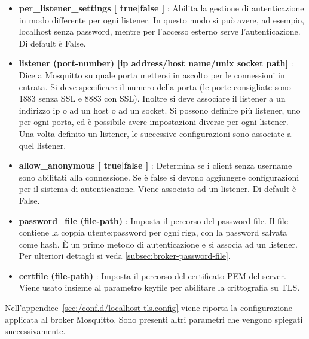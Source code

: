 \begin{itemize}
    \item \textbf{per\_listener\_settings [ true|false ]} :\label{table:broker-per-listener}\newline
    Abilita la gestione di autenticazione in modo differente per ogni listener.
    In questo modo si può avere, ad esempio, localhost senza password, mentre per l'accesso esterno serve
    l'autenticazione. Di default è False.
    \item \textbf{listener (port-number) [ip address/host name/unix socket path]} :\newline
    Dice a Mosquitto su quale porta mettersi in ascolto per le connessioni in entrata.
    Si deve specificare il numero della porta (le porte consigliate sono 1883 senza SSL e 8883 con SSL).
    Inoltre si deve associare il listener a un indirizzo ip o ad un host o ad un socket.
    Si possono definire più listener, uno per ogni porta, ed è possibile avere impostazioni diverse per ogni listener.
    Una volta definito un listener, le successive configurazioni sono associate a quel listener.
    \item \textbf{allow\_anonymous [ true|false ]} :\newline
    Determina se i client senza username sono abilitati alla connessione.
    Se è false si devono aggiungere configurazioni per il sistema di autenticazione.
    Viene associato ad un listener.
    Di default è False.
    \item \textbf{password\_file (file-path)} :\newline
    Imposta il percorso del password file.
    Il file contiene la coppia utente:password per ogni riga, con la password salvata come hash.
    È un primo metodo di autenticazione e si associa ad un listener.
    Per ulteriori dettagli si veda \ref{subsec:broker-password-file}.
    \item \textbf{certfile (file-path)} :\newline
    Imposta il percorso del certificato PEM del server.
    Viene usato insieme al parametro keyfile per abilitare la crittografia su TLS.
\end{itemize}
Nell'appendice~\ref{sec:/conf.d/localhost-tls.config} viene riporta la configurazione applicata al broker Mosquitto.
Sono presenti altri parametri che vengono spiegati successivamente.


